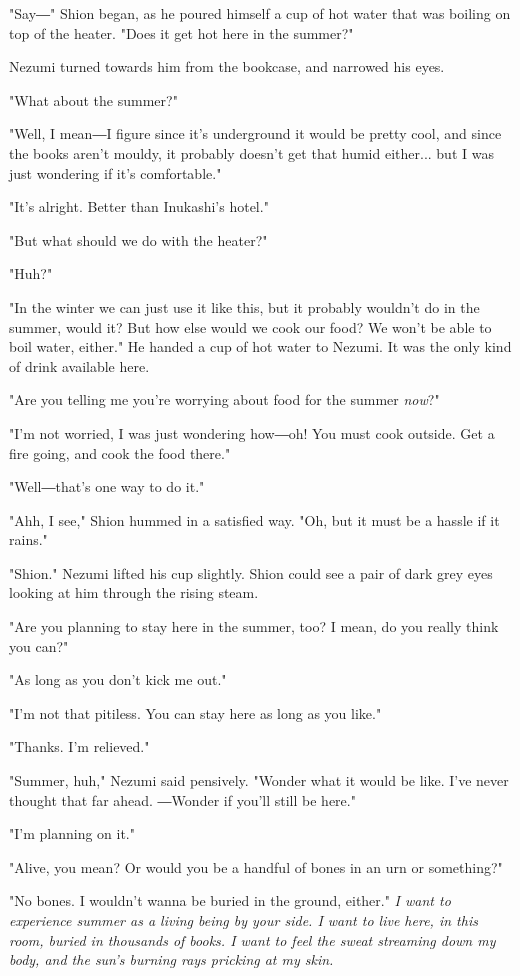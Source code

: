 "Say―" Shion began, as he poured himself a cup of hot water that was
boiling on top of the heater. "Does it get hot here in the summer?"

Nezumi turned towards him from the bookcase, and narrowed his eyes.

"What about the summer?"

"Well, I mean―I figure since it's underground it would be pretty cool,
and since the books aren't mouldy, it probably doesn't get that humid
either... but I was just wondering if it's comfortable."

"It's alright. Better than Inukashi's hotel."

"But what should we do with the heater?"

"Huh?"

"In the winter we can just use it like this, but it probably wouldn't do
in the summer, would it? But how else would we cook our food? We won't
be able to boil water, either." He handed a cup of hot water to Nezumi.
It was the only kind of drink available here.

"Are you telling me you're worrying about food for the summer \emph{now}?"

"I'm not worried, I was just wondering how―oh! You must cook outside.
Get a fire going, and cook the food there."

"Well―that's one way to do it."

"Ahh, I see," Shion hummed in a satisfied way. "Oh, but it must be a
hassle if it rains."

"Shion." Nezumi lifted his cup slightly. Shion could see a pair of dark
grey eyes looking at him through the rising steam.

"Are you planning to stay here in the summer, too? I mean, do you really
think you can?"

"As long as you don't kick me out."

"I'm not that pitiless. You can stay here as long as you like."

"Thanks. I'm relieved."

"Summer, huh," Nezumi said pensively. "Wonder what it would be like.
I've never thought that far ahead. ―Wonder if you'll still be here."

"I'm planning on it."

"Alive, you mean? Or would you be a handful of bones in an urn or
something?"

"No bones. I wouldn't wanna be buried in the ground, either." \emph{I want to
experience summer as a living being by your side. I want to live here,
in this room, buried in thousands of books. I want to feel the sweat
streaming down my body, and the sun's burning rays pricking at my skin.}

